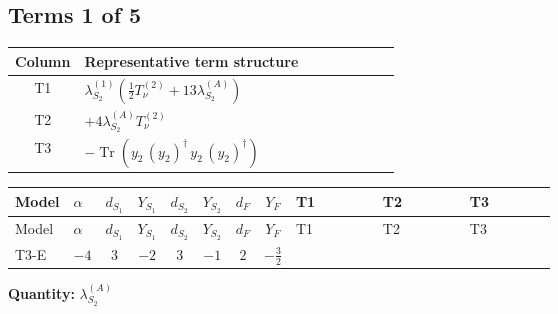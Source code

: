 \documentclass[8pt]{article}
\begin{document}
\begin{landscape}
\subsection*{Terms 1 of 5}
\begin{center}
\begin{tabular}{@{}c >{\raggedright\arraybackslash}p{0.82\linewidth}@{}}
\toprule
Column & Representative term structure \\
\midrule
T1 & \(\displaystyle {\lambda_{S_2}^{(1)}} \left(\frac{1}{2} T_{\nu}^{(2)}+13 {\lambda_{S_2}^{(A)}}\right)\) \\
\midrule
T2 & \(\displaystyle +4 {\lambda_{S_2}^{(A)}} T_{\nu}^{(2)}\) \\
\midrule
T3 & \(\displaystyle -\operatorname{Tr}\!\left({y_2}\,\left({y_2}\right)^{\dagger}\,{y_2}\,\left({y_2}\right)^{\dagger}\right)\) \\
\midrule
\bottomrule
\end{tabular}
\end{center}
\smallskip
\tiny
\begin{longtable}{@{}llcccccc >{\raggedright\arraybackslash}p{0.21\linewidth} >{\raggedright\arraybackslash}p{0.21\linewidth} >{\raggedright\arraybackslash}p{0.21\linewidth}@{}}
\toprule
Model & $\alpha$ & $d_{S_1}$ & $Y_{S_1}$ & $d_{S_2}$ & $Y_{S_2}$ & $d_F$ & $Y_F$ & T1 & T2 & T3 \\
\midrule
\endfirsthead
\toprule
Model & $\alpha$ & $d_{S_1}$ & $Y_{S_1}$ & $d_{S_2}$ & $Y_{S_2}$ & $d_F$ & $Y_F$ & T1 & T2 & T3 \\
\midrule
\endhead
T3-E & $-4$ & $3$ & $-2$ & $3$ & $-1$ & $2$ & $-\frac{3}{2}$ & \scriptsize\adjustbox{max width=\linewidth}{$\begin{gathered} {\lambda_{S_2}^{(1)}} \left(\frac{1}{2} T_{\nu}^{(2)}+13 {\lambda_{S_2}^{(A)}}\right)\end{gathered}$} & \scriptsize\adjustbox{max width=\linewidth}{$\begin{gathered} +4 {\lambda_{S_2}^{(A)}} T_{\nu}^{(2)}\end{gathered}$} & \scriptsize\adjustbox{max width=\linewidth}{$\begin{gathered} -\operatorname{Tr}\!\left({y_2}\,\left({y_2}\right)^{\dagger}\,{y_2}\,\left({y_2}\right)^{\dagger}\right)\end{gathered}$} \\
\midrule
\bottomrule
\end{longtable}
\clearpage
\noindent\textbf{Quantity: }$\lambda_{S_2}^{(A)}$\par\smallskip

\end{landscape}
\end{document}
